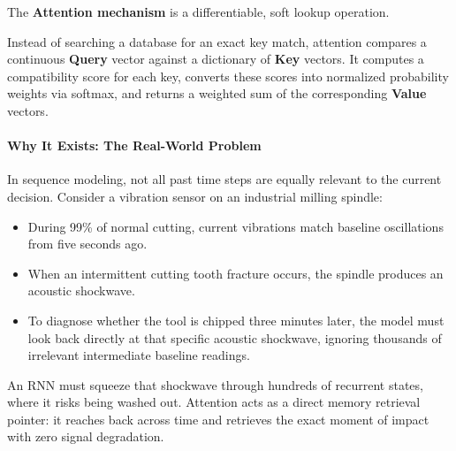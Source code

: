 \begin{keyidea}
The \textbf{Attention mechanism} is a differentiable, soft lookup operation. 

Instead of searching a database for an exact key match, attention compares a continuous \textbf{Query} vector against a dictionary of \textbf{Key} vectors. It computes a compatibility score for each key, converts these scores into normalized probability weights via softmax, and returns a weighted sum of the corresponding \textbf{Value} vectors.
\end{keyidea}

\paragraph{Why It Exists: The Real-World Problem}
In sequence modeling, not all past time steps are equally relevant to the current decision. Consider a vibration sensor on an industrial milling spindle:
\begin{itemize}
    \item During 99\% of normal cutting, current vibrations match baseline oscillations from five seconds ago.
    \item When an intermittent cutting tooth fracture occurs, the spindle produces an acoustic shockwave.
    \item To diagnose whether the tool is chipped three minutes later, the model must look back directly at that specific acoustic shockwave, ignoring thousands of irrelevant intermediate baseline readings.
\end{itemize}
An RNN must squeeze that shockwave through hundreds of recurrent states, where it risks being washed out. Attention acts as a direct memory retrieval pointer: it reaches back across time and retrieves the exact moment of impact with zero signal degradation.

